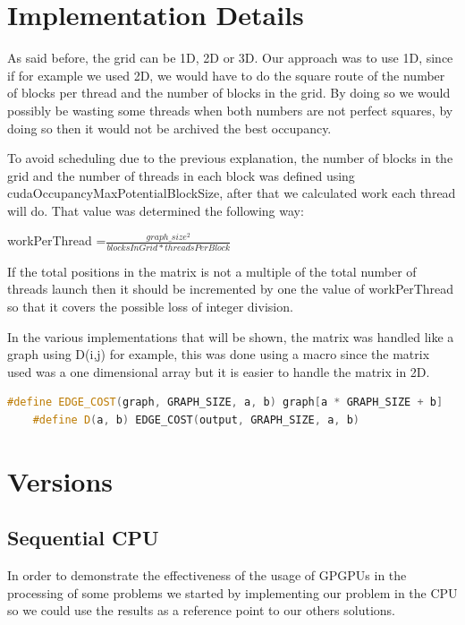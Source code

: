 \documentclass[conference]{IEEEtran}
\begin{document}
\section{Implementation Details}

As said before, the grid can be 1D, 2D or 3D. Our approach was to use 1D, since if for example we used 2D, we would have to do the square route of the number of blocks per thread and the number of blocks in the grid. By doing so we would possibly be wasting some threads when both numbers are not perfect squares, by doing so then it would not be archived the best occupancy.

To avoid scheduling due to the previous explanation, the number of blocks in the grid and the number of threads in each block was defined using cudaOccupancyMaxPotentialBlockSize, after that we calculated work each thread will do. That value was determined the following way:
\newline\newline
\centerline{workPerThread =$\frac{graph\_size^2}{blocksInGrid*threadsPerBlock}$}
\newline\newline
If the total positions in the matrix is not a multiple of the total number of threads launch then it should be incremented by one the value of workPerThread so that it covers the possible loss of integer division.

In the various implementations that will be shown, the matrix was handled like a graph using D(i,j) for example, this was done using a macro since the matrix used was a one dimensional array but it is easier to handle the matrix in 2D.

\begin{lstlisting}[language=C++, caption=Macros used]
	#define EDGE_COST(graph, GRAPH_SIZE, a, b) graph[a * GRAPH_SIZE + b]
	#define D(a, b) EDGE_COST(output, GRAPH_SIZE, a, b)
\end{lstlisting}

\section{Versions}
\subsection{Sequential CPU}
In order to demonstrate the effectiveness of the usage of GPGPUs in the processing 
of some problems we started by implementing our problem in the CPU so we could use the results as a reference point to our others solutions.
\end{document}
